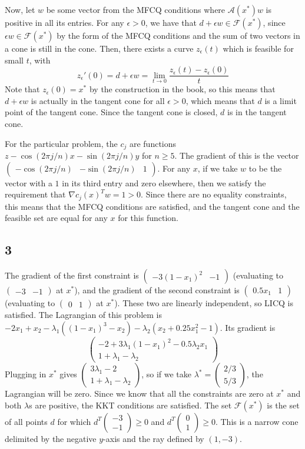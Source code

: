 \documentclass{article}
\newcommand{\ep}{\epsilon}
\newcommand{\openm}{\begin{pmatrix}}
\newcommand{\closem}{\end{pmatrix}}
\begin{document}
Now, let $w$ be some vector from the MFCQ conditions where $\mathscr{A}(x^*)w$ is positive in all its entries. For any $\ep>0$, we have that $d+\ep w\in\mathscr{F}(x^*)$, since $\ep w\in\mathscr{F}(x^*)$ by the form of the MFCQ conditions and the sum of two vectors in a cone is still in the cone. Then, there exists a curve $z_\ep(t)$ which is feasible for small $t$, with 
\[z_\ep'(0)=d+\ep w=\lim_{t\to 0}\frac{z_\ep(t)-z_\ep(0)}{t}\]
Note that $z_\ep(0)=x^*$ by the construction in the book, so this means that $d+\ep w$ is actually in the tangent cone for all $\ep>0$, which means that $d$ is a limit point of the tangent cone. Since the tangent cone is closed, $d$ is in the tangent cone.

For the particular problem, the $c_j$ are functions $z-\cos(2\pi j/n)x-\sin(2\pi j/n)y$ for $n\geq5$. The gradient of this is the vector $\openm -\cos(2\pi j/n)&-\sin(2\pi j/n)&1\closem$. For any $x$, if we take $w$ to be the vector with a $1$ in its third entry and zero elsewhere, then we satisfy the requirement that $\nabla c_j(x)^Tw=1>0$. Since there are no equality constraints, this means that the MFCQ conditions are satisfied, and the tangent cone and the feasible set are equal for any $x$ for this function.
\subsection*{3}
The gradient of the first constraint is $\openm-3(1-x_1)^2&-1\closem$ (evaluating to $\openm -3&-1\closem$ at $x^*$), and the gradient of the second constraint is $\openm0.5x_1&1\closem$ (evaluating to $\openm 0&1\closem$ at $x^*$). These two are linearly independent, so LICQ is satisfied.
The Lagrangian of this problem is $-2x_1+x_2-\lambda_1((1-x_1)^3-x_2)-\lambda_2(x_2+0.25x_1^2-1)$. Its gradient is
\[\openm-2+3\lambda_1(1-x_1)^2-0.5\lambda_2x_1\\1+\lambda_1-\lambda_2\closem\]
Plugging in $x^*$ gives $\openm 3\lambda_1-2\\1+\lambda_1-\lambda_2\closem$, so if we take $\lambda^*=\openm2/3\\5/3\closem$, the Lagrangian will be zero. Since we know that all the constraints are zero at $x^*$ and both $\lambda$s are positive, the KKT conditions are satisfied.
The set $\mathscr{F}(x^*)$ is the set of all points $d$ for which $d^T\openm-3\\-1\closem\geq0$ and $d^T\openm0\\1\closem\geq0$. This is a narrow cone delimited by the negative $y$-axis and the ray defined by $(1,-3)$. 
\end{document}

